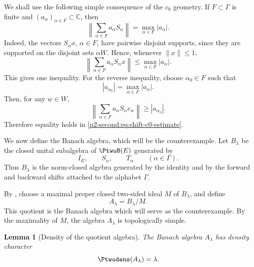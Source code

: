 \documentclass[11pt,reqno]{amsart}
\makeatletter
\theoremstyle{plain}
\newtheorem{lemma}[lemma]{Lemma}
\theoremstyle{definition}
\newcommand{\C}{\mathbb C}
\newcounter{problempaper}
\newenvironment{problempaperbody}{%
  \setcounter{subsection}{0}%
  \setcounter{subsubsection}{0}%
  \setcounter{paragraph}{0}%
  \renewcommand{\thesubsection}{\arabic{subsection}}%
  \renewcommand{\thesubsubsection}{\thesubsection.\arabic{subsubsection}}%
  \renewcommand{\theparagraph}{\thesubsubsection.\arabic{paragraph}}%
  \let\problem@outersection\section
  \let\problem@outersubsection\subsection
  \let\problem@outersubsubsection\subsubsection
  \let\problem@outerparagraph\paragraph
  \let\section\problem@papersection
  \let\subsection\problem@papersubsection
  \let\subsubsection\problem@papersubsubsection
}{%
  \let\section\problem@outersection
  \let\subsection\problem@outersubsection
  \let\subsubsection\problem@outersubsubsection
  \let\paragraph\problem@outerparagraph
}
\newcommand{\problem@target}[2]{%
  \hypertarget{problem-\theproblempaper-#1-#2}{}%
}
\newcommand{\problem@paperheading}[3]{%
  \par\bigskip
  \problem@target{#1}{#2}%
  \noindent{\large\bfseries #2.\quad #3\par}%
  \nobreak\smallskip
}
\newcommand{\problem@papersubheading}[3]{%
  \par\medskip
  \problem@target{#1}{#2}%
  \noindent{\normalsize\bfseries #2.\quad #3\par}%
  \nobreak\smallskip
}
\newcommand{\problem@papersubsubheading}[3]{%
  \par\smallskip
  \problem@target{#1}{#2}%
  \noindent{\normalsize\itshape #2.\quad #3.\ }%
}
\def\problem@papersection{%
  \@ifstar{\problem@papersectionstar}{\problem@papersectionnostar}%
}
\def\problem@papersectionstar#1{%
  \par\bigskip\noindent{\large\bfseries #1\par}\nobreak\smallskip
}
\def\problem@papersectionnostar#1{%
  \refstepcounter{subsection}%
  \setcounter{subsubsection}{0}%
  \setcounter{paragraph}{0}%
  \problem@paperheading{section}{\thesubsection}{#1}%
  \problem@writecontentsline{section}{\thesubsection}{#1}%
}
\def\problem@papersubsection{%
  \@ifstar{\problem@papersubsectionstar}{\problem@papersubsectionnostar}%
}
\def\problem@papersubsectionstar#1{%
  \par\medskip\noindent{\normalsize\bfseries #1\par}\nobreak\smallskip
}
\def\problem@papersubsectionnostar#1{%
  \refstepcounter{subsubsection}%
  \setcounter{paragraph}{0}%
  \problem@papersubheading{subsection}{\thesubsubsection}{#1}%
  \problem@writecontentsline{subsection}{\thesubsubsection}{#1}%
}
\def\problem@papersubsubsection{%
  \@ifstar{\problem@papersubsubsectionstar}{\problem@papersubsubsectionnostar}%
}
\def\problem@papersubsubsectionstar#1{%
  \par\smallskip\noindent{\normalsize\itshape #1.\ }%
}
\def\problem@papersubsubsectionnostar#1{%
  \refstepcounter{paragraph}%
  \problem@papersubsubheading{subsubsection}{\theparagraph}{#1}%
  \problem@writecontentsline{subsubsection}{\theparagraph}{#1}%
}
\newcommand{\problem@writecontentsline}[3]{%
  \begingroup
  \protected@write\@auxout{}{%
    \string\problemcontentsentry{\theproblempaper}{#1}{#2}{#3}{\thepage}%
  }%
  \endgroup
}
\newcommand{\problemcontentsentry}[5]{%
  \@ifundefined{problemcontents@#1}{%
    \expandafter\gdef\csname problemcontents@#1\endcsname{}%
  }{}%
  \expandafter\g@addto@macro\csname problemcontents@#1\endcsname{%
    \problemcontentsline{#1}{#2}{#3}{#4}{#5}%
  }%
}
\newcommand{\problemcontentslink}[4]{%
  \hyperlink{problem-#1-#2-#3}{#4}%
}
\newcommand{\problemcontentsline}[5]{%
  \ifstrequal{#2}{section}{%
    \par\noindent
    \problemcontentslink{#1}{#2}{#3}{\makebox[2.5em][l]{#3}#4}%
    \nobreak\dotfill
    \problemcontentslink{#1}{#2}{#3}{#5}\par
  }{%
    \ifstrequal{#2}{subsection}{%
      \par\noindent\hspace*{1.5em}%
      \problemcontentslink{#1}{#2}{#3}{\makebox[3.5em][l]{#3}#4}%
      \nobreak\dotfill
      \problemcontentslink{#1}{#2}{#3}{#5}\par
    }{%
      \par\noindent\hspace*{3em}%
      \problemcontentslink{#1}{#2}{#3}{\makebox[4.5em][l]{#3}#4}%
      \nobreak\dotfill
      \problemcontentslink{#1}{#2}{#3}{#5}\par
    }%
  }%
}
\makeatother
\begin{document}
\begin{problempaperbody}
We shall use the following simple consequence of the $c_0$ geometry. If $F\subset\Gamma$ is finite and $(a_\alpha)_{\alpha\in F}\subset\C$, then
\begin{equation}
\label{p2-second:eq:shift-c0-estimate}
        \left\|\sum_{\alpha\in F}a_\alpha S_\alpha\right\|=\max_{\alpha\in F}|a_\alpha|.
\end{equation}
Indeed, the vectors $S_\alpha x$, $\alpha\in F$, have pairwise disjoint supports, since they are supported on the disjoint sets $\alpha W$. Hence, whenever $\|x\|\leq1$,
\begin{equation*}
        \left\|\sum_{\alpha\in F}a_\alpha S_\alpha x\right\|\leq \max_{\alpha\in F}|a_\alpha|.
\end{equation*}
This gives one inequality. For the reverse inequality, choose $\alpha_0\in F$ such that
\begin{equation*}
        |a_{\alpha_0}|=\max_{\alpha\in F}|a_\alpha|.
\end{equation*}
Then, for any $w\in W$,
\begin{equation*}
        \left\|\sum_{\alpha\in F}a_\alpha S_\alpha e_w\right\|\geq |a_{\alpha_0}|.
\end{equation*}
Therefore equality holds in \eqref{p2-second:eq:shift-c0-estimate}.

We now define the Banach algebra, which will be the counterexample. Let $B_\lambda$ be the closed unital subalgebra of $\PtwoB(E)$ generated by
\begin{equation*}
        I_E,\qquad S_\alpha,\qquad T_\alpha \qquad(\alpha\in\Gamma).
\end{equation*}
Thus $B_\lambda$ is the norm-closed algebra generated by the identity and by the forward and backward shifts attached to the alphabet $\Gamma$.

By , choose a maximal proper closed two-sided ideal $M$ of $B_\lambda$, and define
\begin{equation}
\label{p2-second:eq:definition-of-A-lambda}
        A_\lambda=B_\lambda/M.
\end{equation}
This quotient is the Banach algebra which will serve as the counterexample. By the maximality of $M$, the algebra $A_\lambda$ is topologically simple.

\begin{lemma}[Density of the quotient algebra]
\label{p2-second:lem:density-A}
The Banach algebra $A_\lambda$ has density character
\begin{equation*}
        \Ptwodens(A_\lambda)=\lambda.
\end{equation*}
\end{lemma}


\end{problempaperbody}
\end{document}
